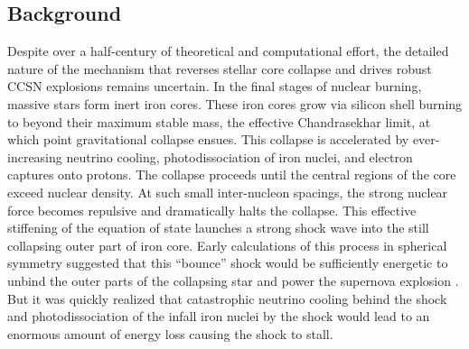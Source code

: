 \subsection{Background}

Despite over a half-century of theoretical and computational effort, the detailed nature of the mechanism that reverses stellar core collapse and drives robust CCSN explosions remains uncertain.
In the final stages of nuclear burning, massive stars form inert iron cores.
These iron cores grow via silicon shell burning to beyond their maximum stable mass, the effective Chandrasekhar limit, at which point gravitational collapse ensues.
This collapse is accelerated by ever-increasing neutrino cooling, photodissociation of iron nuclei, and electron captures onto protons.
The collapse proceeds until the central regions of the core exceed nuclear density.
At such small inter-nucleon spacings, the strong nuclear force becomes repulsive and dramatically halts the collapse.
This effective stiffening of the equation of state launches a strong shock wave into the still collapsing outer part of iron core.
Early calculations of this process in spherical symmetry suggested that this ``bounce'' shock would be sufficiently energetic to unbind the outer parts of the collapsing star and power the supernova explosion \citep{Colgate:1961}.
But it was quickly realized that catastrophic neutrino cooling behind the shock and photodissociation of the infall iron nuclei by the shock would lead to an enormous amount of energy loss causing the shock to stall.




